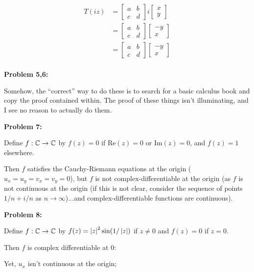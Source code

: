 \documentclass[a4paper,12pt]{article}
\begin{document}
\begin{align*}
T(iz) &= \left[\begin{smallmatrix} a&b\\ c&d \end{smallmatrix}\right] i\left[\begin{smallmatrix} x\\ y \end{smallmatrix}\right]\\
&= \left[\begin{smallmatrix} a&b\\ c&d \end{smallmatrix}\right] \left[\begin{smallmatrix} -y\\ x \end{smallmatrix}\right]\\
&= \left[\begin{smallmatrix} a&b\\ c&d \end{smallmatrix}\right] \left[\begin{smallmatrix} -y\\ x \end{smallmatrix}\right]\\
\end{align*}

\shunt

{\bf Problem 5,6:}

Somehow, the ``correct'' way to do these is to search for a basic calculus book and copy the proof contained within. The proof of these things isn't illuminating, and I see no reason to actually do them.

{\bf Problem 7:}

Define $f: \mathbb{C} \to \mathbb{C}$ by $f(z) = 0$ if $\text{Re}(z) = 0$ or $\text{Im}(z) = 0$, and $f(z) = 1$ elsewhere.

Then $f$ satisfies the Cauchy-Riemann equations at the origin ($u_x=u_y=v_x=v_y=0$), but $f$ is not complex-differentiable at the origin (as $f$ is not continuous at the origin (if this is not clear, consider the sequence of points $1/n + i/n$ as $n \to \infty$)...and complex-differentiable functions are continuous).

\shunt

{\bf Problem 8:}

Define $f: \mathbb{C} \to \mathbb{C}$ by $f(z) = \left\lvert z \right\rvert^2 \sin(1/\left\lvert z \right\rvert)$ if $z \neq 0$ and $f(z) = 0$ if $z = 0$.

Then $f$ is complex differentiable at $0$: %

Yet, $u_x$ isn't continuous at the origin; %

\shunt
\end{document}
